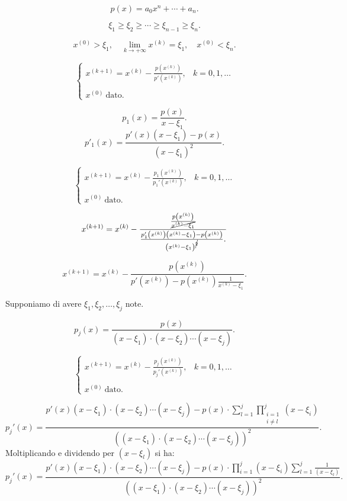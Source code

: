 \[p(x) = a_0x^n + \cdots + a_n.\]

\[
\xi_1 \geq \xi_2 \geq \cdots \geq \xi_{n-1} \geq \xi_n.
\]

\[
x^{(0)}> \xi_1, \quad \lim_{k \to +\infty}x^{(k)} = \xi_1, \quad x^{(0)} < \xi_n.
\]

\[\left\{\begin{array}{lr}
x^{(k+1)} = x^{(k)} - \frac{p\left(x^{(k)}\right)}{p'\left(x^{(k)}\right)}, & 
k = 0,1,\ldots \\\\
x^{(0)} \ \textrm{dato.}
\end{array}\right.\]

\[
p_1(x) = \frac{p(x)}{x -\xi_1}.
\]
\[
p'_1(x) = \frac{p'(x)(x-\xi_1)-p(x)}{(x -\xi_1)^2}.
\]

\[\left\{\begin{array}{lr}
x^{(k+1)} = x^{(k)} - \frac{p_1\left(x^{(k)}\right)}{p_1'\left(x^{(k)}\right)}, &
 k = 0,1,\ldots \\\\
x^{(0)} \ \textrm{dato.}
\end{array}\right.\]

\[
x^{(k+1)} = x^{(k)} - \frac{\frac{p\left(x^{(k)}\right)}{\cancel{x^{(k)}-\xi_1}}}{
\frac{p_1'\left(x^{(k)}\right)\left(x^{(k)}-\xi_1\right) - p\left(x^{(k)}\right)}
{\left(x^{(k)}-\xi_1\right)^{\cancel{2}}}.
}
\]

\[
x^{(k+1)} = x^{(k)} -\frac{p(x^{(k)})}{p'(x^{(k)}) -
p(x^{(k)}) \frac{1}{x^{(k)}-\xi_1}}.
\]

Supponiamo di avere $\xi_1, \xi_2, \ldots, \xi_j$ note.

\[
p_j(x) = \frac{p(x)}{(x-\xi_1)\cdot(x-\xi_2)\cdots (x-\xi_j)}.
\]

\[\left\{\begin{array}{lr}
x^{(k+1)} = x^{(k)} - \frac{p_j\left(x^{(k)}\right)}{p_j'\left(x^{(k)}\right)}, &
 k = 0,1,\ldots \\\\
x^{(0)} \ \textrm{dato.}
\end{array}\right.\]

\[
p_j'(x) = \frac{p'(x)(x-\xi_1)\cdot(x-\xi_2)\cdots (x-\xi_j) - p(x)\cdot
\sum_{l=1}^j\prod_{\substack{i = 1 \\ i \neq l}}^j (x-\xi_i)}{\left(
(x-\xi_1)\cdot(x-\xi_2)\cdots (x-\xi_j)\right)^2}.
\]
Moltiplicando e dividendo per $(x - \xi_l)$ si ha:
\[
p_j'(x) = \frac{p'(x)(x-\xi_1)\cdot(x-\xi_2)\cdots (x-\xi_j) - p(x)\cdot
\prod_{i = 1}^j (x-\xi_i)  \sum_{l=1}^j\frac{1}{(x - \xi_l)}}
{\left((x-\xi_1)\cdot(x-\xi_2)\cdots (x-\xi_j)\right)^2}.
\]

